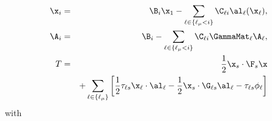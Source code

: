 \begin{eqnarray}
\x_{i} &=& \B_i \x_1 - \sum_{\ell \in \{\ell_\mu<i\}} \C_{\ell i} \al_\ell(\x_\ell), \\
\A_{i} &=& \B_i - \sum_{\ell \in \{\ell_\mu<i\}} \C_{\ell i} \GammaMat_\ell \A_\ell, \\
T &=& \frac{1}{2} \x_s \cdot \F_s \x \nonumber \\
&&+ \sum\limits_{\ell \in \{\ell_\mu\}}\left[\frac{1}{2}\tau_{\ell s} \x_\ell \cdot \al_\ell -\frac{1}{2}\x_s \cdot \G_{\ell s}\al_\ell -\tau_{\ell s}\phi_\ell \right]
\end{eqnarray}
\normalsize
with